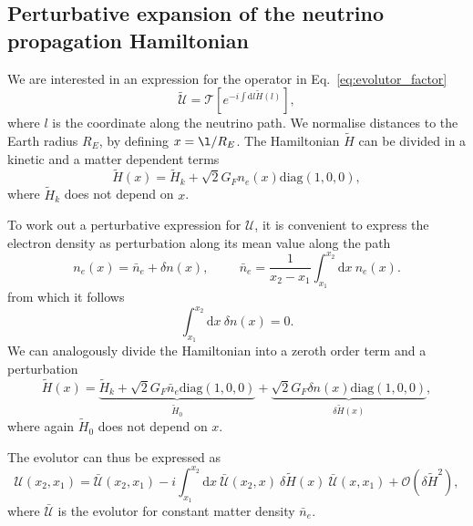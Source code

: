 \documentclass{article}
\newcommand{\de}[0]{\text{d}}
\begin{document}
\subsection{Perturbative expansion of the neutrino propagation Hamiltonian}
We are interested in an expression for the operator in Eq.~\ref{eq:evolutor_factor}
\begin{equation}\label{eq:evolutor_12-13}
	\tilde{\mathcal{U}} = \mathcal{T} \left[ e^{- i \int \de l \tilde{H}(l)} \right],
\end{equation}
where $l$ is the coordinate along the neutrino path. We normalise distances to the Earth radius $R_E$, by defining $x = \l/R_E$. The Hamiltonian $\tilde{H}$ can be divided in a kinetic and a matter dependent terms
\begin{equation}
	\tilde{H}(x) = \tilde{H}_k + \sqrt{2} G_F n_e(x)\text{diag}(1,0,0),
\end{equation}
where $\tilde{H}_k$ does not depend on $x$.

To work out a perturbative expression for $\mathcal{U}$, it is convenient to express the electron density as perturbation along its mean value along the path~\cite{Lisi:1997yc}
\begin{equation}
	n_e(x) = \bar{n}_e + \delta n(x), \hspace{1cm} \bar{n}_e =\frac{1}{x_2-x_1} \int_{x_1}^{x_2} \de x \ n_e(x).
\end{equation}
from which it follows
\begin{equation}
	\int_{x_1}^{x_2} \de x\ \delta n(x) = 0.
\end{equation} 
We can analogously divide the Hamiltonian into a zeroth order term and a perturbation
\begin{equation}
	\tilde{H}(x) = \underbrace{\tilde{H}_k + \sqrt{2}G_F \bar{n}_e \text{diag}(1,0,0)}_{\tilde{H}_0} + \underbrace{\sqrt{2}G_F \delta n(x) \text{diag}(1,0,0)}_{\delta \tilde{H}(x)},
\end{equation}
where again $\tilde{H}_0$ does not depend on $x$.

The evolutor can thus be expressed as~\cite{Lisi:1997yc}
\begin{equation}
	\mathcal{U}(x_2,x_1) = \bar{\mathcal{U}}(x_2,x_1) - i \int_{x_1}^{x_2} \de x\ \bar{\mathcal{U}}(x_2,x)\ \delta \tilde{H}(x)\ \bar{\mathcal{U}}(x,x_1) + \mathcal{O}(\delta\tilde{H}^2),\label{eq:evolutor_1}
\end{equation}
where $\bar{\mathcal{U}}$ is the evolutor for constant matter density $\bar{n}_e$.
\end{document}
